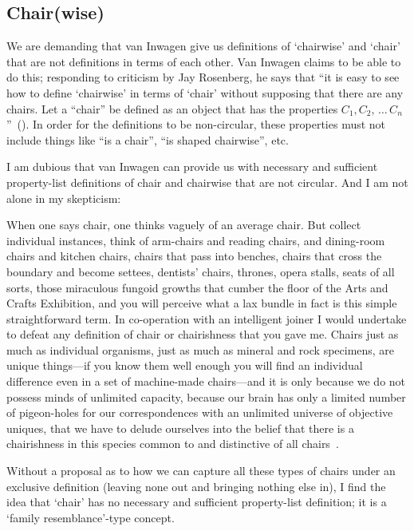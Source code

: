\documentclass[11pt]{article}
\newenvironment{squote}{%
	\begin{spacing}{1}
	\begin{list}{}{%
	\setlength{\labelwidth}{0pt}%
	\rightmargin\leftmargin%
	}
	\item\relax
	}{%
	\end{list}%
	\end{spacing}
	}
\begin{document}
\begin{spacing}{1.5}
\subsection{Chair(wise)}
We are demanding that van Inwagen give us definitions of `chairwise' and `chair' that are not definitions in terms of each other. Van Inwagen claims to be able to do this; responding to criticism by Jay Rosenberg, he says that ``it is easy to see how to define `chairwise' in terms of `chair' without supposing that there are any chairs. Let a ``chair'' be defined as an object that has the properties $C_{1}, C_{2},\,\dots\,C_{n}$''~(\citeyear[719]{inwagen1993b}). In order for the definitions to be non-circular, these properties must not include things like ``is a chair'', ``is shaped chairwise'', etc.

I am dubious that van Inwagen can provide us with necessary and sufficient property-list definitions of chair and chairwise that are not circular. And I am not alone in my skepticism:
\begin{squote}
When one says chair, one thinks vaguely of an average chair. But collect individual instances, think of arm-chairs and reading chairs, and dining-room chairs and kitchen chairs, chairs that pass into benches, chairs that cross the boundary and become settees, dentists' chairs, thrones, opera stalls, seats of all sorts, those miraculous fungoid growths that cumber the floor of the Arts and Crafts Exhibition, and you will perceive what a lax bundle in fact is this simple straightforward term. In co-operation with an intelligent joiner I would undertake to defeat any definition of chair or chairishness that you gave me. Chairs just as much as individual organisms, just as much as mineral and rock specimens, are unique things---if you know them well enough you will find an individual difference even in a set of machine-made chairs---and	it is only because we do not possess minds of unlimited capacity, because our brain has only a limited number of pigeon-holes for our correspondences with an unlimited universe of objective uniques, that we have to delude ourselves into the belief that there is a chairishness in this species common to and distinctive of all chairs~\citep[384--385]{wells1904}.
\end{squote}

Without a proposal as to how we can capture all these types of chairs under an exclusive definition (leaving none out and bringing nothing else in), I find the idea that `chair' has no necessary and sufficient property-list definition; it is a `family resemblance'-type concept.

\ifstandalone
\end{spacing}


\fi
\end{document}
